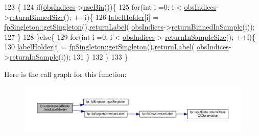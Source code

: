 \begin{DoxyCode}
123                                              \{
124                     \textcolor{keywordflow}{if}(\hyperlink{classfp_1_1unprocessedNode_aba9f03124658f62906fa8ded53cef535}{obsIndices}->\hyperlink{classfp_1_1stratifiedInNodeClassIndices_af740a8054cefe977f8f1288fc6b39109}{useBin}())\{
125                         \textcolor{keywordflow}{for}(\textcolor{keywordtype}{int} i =0; i < \hyperlink{classfp_1_1unprocessedNode_aba9f03124658f62906fa8ded53cef535}{obsIndices}->\hyperlink{classfp_1_1stratifiedInNodeClassIndices_a9f77fe5e638170c4ad4ce99541561cfc}{returnBinnedSize}(); ++i)\{
126                             \hyperlink{classfp_1_1unprocessedNode_a2aa2f9dcba0b0a859457ed22e147f698}{labelHolder}[i] = 
      \hyperlink{classfp_1_1fpSingleton_a8bdae77b68521003e3fc630edec2e240}{fpSingleton::getSingleton}().\hyperlink{classfp_1_1fpSingleton_aa2f644b1521948fb994f4087ddfaea14}{returnLabel}(
      \hyperlink{classfp_1_1unprocessedNode_aba9f03124658f62906fa8ded53cef535}{obsIndices}->\hyperlink{classfp_1_1stratifiedInNodeClassIndices_a775d9a820b6f48ab44cd1ac4ffde1578}{returnBinnedInSample}(i));
127                         \}
128                     \}\textcolor{keywordflow}{else}\{
129                         \textcolor{keywordflow}{for}(\textcolor{keywordtype}{int} i =0; i < \hyperlink{classfp_1_1unprocessedNode_aba9f03124658f62906fa8ded53cef535}{obsIndices}->
      \hyperlink{classfp_1_1stratifiedInNodeClassIndices_a596235ffec7250fabd2818d395b39c66}{returnInSampleSize}(); ++i)\{
130                             \hyperlink{classfp_1_1unprocessedNode_a2aa2f9dcba0b0a859457ed22e147f698}{labelHolder}[i] = 
      \hyperlink{classfp_1_1fpSingleton_a8bdae77b68521003e3fc630edec2e240}{fpSingleton::getSingleton}().\hyperlink{classfp_1_1fpSingleton_aa2f644b1521948fb994f4087ddfaea14}{returnLabel}(
      \hyperlink{classfp_1_1unprocessedNode_aba9f03124658f62906fa8ded53cef535}{obsIndices}->\hyperlink{classfp_1_1stratifiedInNodeClassIndices_a2d7e802fb97db0367bb8e8f31d393afd}{returnInSample}(i));
131                         \}
132                     \}
133                 \}
\end{DoxyCode}
Here is the call graph for this function\+:
\nopagebreak
\begin{figure}[H]
\begin{center}
\leavevmode
\includegraphics[width=350pt]{classfp_1_1unprocessedNode_a7b286c437f8f73fb3431358c11898a82_cgraph}
\end{center}
\end{figure}
\mbox{\label{classfp_1_1unprocessedNode_a7b286c437f8f73fb3431358c11898a82}} 
